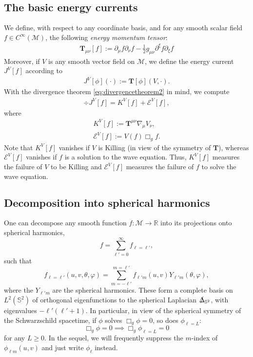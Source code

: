 \documentclass[11pt,english]{article}
\numberwithin{equation}{section}
\theoremstyle{remark}
\theoremstyle{plain}
\theoremstyle{remark}
\renewcommand{\(}{\left(}
\renewcommand{\)}{\right)}
\begin{document}
\subsection{The basic energy currents}
We define, with respect to any coordinate basis, and for any smooth scalar field $f\in C^{\infty}(\mathcal{M})$, the following \textit{energy momentum tensor}:
\begin{align*}
\mathbf{T}_{\mu\nu}[f]:=\partial_\mu f\partial_\nu f-\frac12 g_{\mu\nu} \partial^\xi f\partial_\xi f
\end{align*}
Moreover, if $V$ is any smooth vector field on $\mathcal{M}$, we define the energy current $J^V[f]$ according to
\begin{align*}
J^V[\phi](\cdot):=\mathbf{T}[\phi](V,\cdot).
\end{align*}
With the divergence theorem \eqref{eq:divergencetheorem2} in mind, we compute
\begin{align}\label{eq:def:J}
\div J^V[f]=K^V[f]+\mathcal{E}^V[f],
\end{align}
where
\begin{align}
K^V[f]:=\mathbf{T}^{\mu\nu}\nabla_{\mu} V_{\nu},\\
\mathcal{E}^V[f]:=V(f)\Box_g f.
\end{align}
Note that $K^V[f]$ vanishes if $V$ is Killing (in view of the symmetry of $\mathbf{T}$), whereas $\mathcal{E}^V[f]$ vanishes if $f$ is a solution to the wave equation. Thus, $K^V[f]$ measures the failure of $V$ to be Killing and $\mathcal{E}^V[f]$ measures the failure of $f$ to solve the wave equation.

\subsection{Decomposition into spherical harmonics}\label{sec:decompositionintoYlm}
One can decompose any smooth function $f:\mathcal{M}\to \mathbb{R}$ into its projections onto spherical harmonics,
\[
f=\sum_{\ell'=0}^\infty f_{\ell=\ell'},
\]
such that
\[
f_{\ell=\ell'}(u,v,\theta, \varphi)=\sum_{m=-\ell'}^{m=\ell'}f_{\ell'm}(u,v)Y_{\ell'm}(\theta, \varphi),
\]
where the $Y_{\ell'm}$ are the spherical harmonics. These form a complete basis on $L^2(\mathbb{S}^2)$ of orthogonal eigenfunctions to the spherical Laplacian $\slashed{\Delta}_{\mathbb{S}^2}$, with eigenvalues $-\ell'(\ell'+1)$.
In particular, in view of the spherical symmetry of the Schwarzschild spacetime, if $\phi$ solves $\Box_g\phi=0$, so does $\phi_{\ell=L}$:
$$ \Box_g\phi=0 \implies \Box_g\phi_{\ell=L}=0$$
for any $L\geq 0$. In the sequel, we will frequently suppress the $m$-index of $\phi_{\ell m}(u,v)$ and just write $\phi_\ell$ instead.
\end{document}
